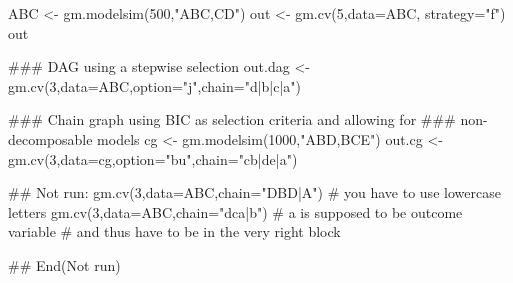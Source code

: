 \begin{Examples}
\begin{ExampleCode}
  
  ABC <- gm.modelsim(500,"ABC,CD")
  out <- gm.cv(5,data=ABC, strategy="f")
  out
  
  ### DAG using a stepwise selection
  out.dag <- gm.cv(3,data=ABC,option="j",chain="d|b|c|a")  
  
  ### Chain graph using BIC as selection criteria and allowing for 
  ### non-decomposable models
  cg <- gm.modelsim(1000,"ABD,BCE")  
  out.cg <- gm.cv(3,data=cg,option="bu",chain="cb|de|a")
  
  ## Not run: 
gm.cv(3,data=ABC,chain="DBD|A") # you have to use lowercase letters
            gm.cv(3,data=ABC,chain="dca|b") # a is supposed to be outcome variable 
                                  # and thus have to be in the very right block    
            
## End(Not run)
\end{ExampleCode}
\end{Examples}

